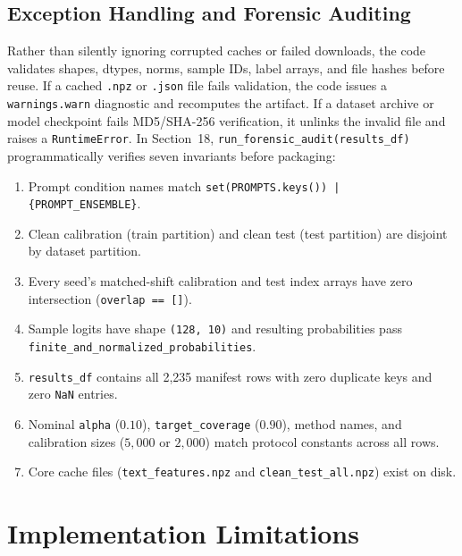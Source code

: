\documentclass[11pt,a4paper]{article}
\begin{document}
\subsection{Exception Handling and Forensic Auditing}
Rather than silently ignoring corrupted caches or failed downloads, the code validates shapes, dtypes, norms, sample IDs, label arrays, and file hashes before reuse. If a cached \texttt{.npz} or \texttt{.json} file fails validation, the code issues a \texttt{warnings.warn} diagnostic and recomputes the artifact. If a dataset archive or model checkpoint fails MD5/SHA-256 verification, it unlinks the invalid file and raises a \texttt{RuntimeError}. In Section~18, \texttt{run\_\allowbreak{}forensic\_\allowbreak{}audit(results\_\allowbreak{}df)} programmatically verifies seven invariants before packaging:
\begin{enumerate}
  \item Prompt condition names match \texttt{set(PROMPTS.keys()) | \{PROMPT\_ENSEMBLE\}}.
  \item Clean calibration (train partition) and clean test (test partition) are disjoint by dataset partition.
  \item Every seed's matched-shift calibration and test index arrays have zero intersection (\texttt{overlap == []}).
  \item Sample logits have shape \texttt{(128, 10)} and resulting probabilities pass \texttt{finite\_\allowbreak{}and\_\allowbreak{}normalized\_\allowbreak{}probabilities}.
  \item \texttt{results\_\allowbreak{}df} contains all 2,235 manifest rows with zero duplicate keys and zero \texttt{NaN} entries.
  \item Nominal \texttt{alpha} ($0.10$), \texttt{target\_\allowbreak{}coverage} ($0.90$), method names, and calibration sizes ($5{,}000$ or $2{,}000$) match protocol constants across all rows.
  \item Core cache files (\texttt{text\_\allowbreak{}features.npz} and \texttt{clean\_\allowbreak{}test\_\allowbreak{}all.npz}) exist on disk.
\end{enumerate}

\section{Implementation Limitations}
\label{sec:limitations}
\end{document}
